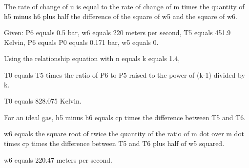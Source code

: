 The rate of change of u is equal to the rate of change of m times the quantity of h5 minus h6 plus half the difference of the square of w5 and the square of w6.

Given: P6 equals 0.5 bar, w6 equals 220 meters per second, T5 equals 451.9 Kelvin, P6 equals P0 equals 0.171 bar, w5 equals 0.

Using the relationship equation with n equals k equals 1.4,

T0 equals T5 times the ratio of P6 to P5 raised to the power of (k-1) divided by k.

T0 equals 828.075 Kelvin.

For an ideal gas, h5 minus h6 equals cp times the difference between T5 and T6.

w6 equals the square root of twice the quantity of the ratio of m dot over m dot times cp times the difference between T5 and T6 plus half of w5 squared.

w6 equals 220.47 meters per second.
